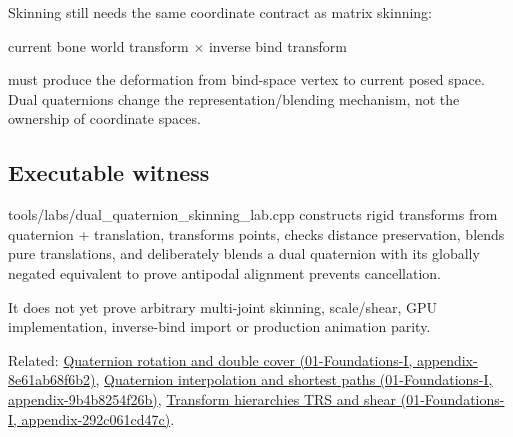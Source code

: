 Skinning still needs the same coordinate contract as matrix skinning:

current bone world transform × inverse bind transform

must produce the deformation from bind-space vertex to current posed space. Dual quaternions change the representation/blending mechanism, not the ownership of coordinate spaces.

\subsection{Executable witness}\label{appendix-921f3f2efb53-executable-witness}

tools/labs/dual\_quaternion\_skinning\_lab.cpp constructs rigid transforms from quaternion + translation, transforms points, checks distance preservation, blends pure translations, and deliberately blends a dual quaternion with its globally negated equivalent to prove antipodal alignment prevents cancellation.

It does not yet prove arbitrary multi-joint skinning, scale/shear, GPU implementation, inverse-bind import or production animation parity.

Related: \href{../01-Foundations-I/main.pdf\#nameddest=appendix-8e61ab68f6b2}{Quaternion rotation and double cover (01-Foundations-I, appendix-8e61ab68f6b2)}, \href{../01-Foundations-I/main.pdf\#nameddest=appendix-9b4b8254f26b}{Quaternion interpolation and shortest paths (01-Foundations-I, appendix-9b4b8254f26b)}, \href{../01-Foundations-I/main.pdf\#nameddest=appendix-292c061cd47c}{Transform hierarchies TRS and shear (01-Foundations-I, appendix-292c061cd47c)}.
